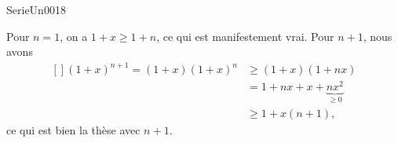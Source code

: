 

\begin{corrige}{SerieUn0018}

	Pour $n=1$, on a $1+x\geq 1+n$, ce qui est manifestement vrai. Pour $n+1$, nous avons
	\begin{equation}
		\begin{aligned}[]
			(1+x)^{n+1}=(1+x)(1+x)^n&\geq (1+x)(1+nx)\\
							&=1+nx+x+\underbrace{nx^2}_{\geq 0}\\
							&\geq 1+x(n+1),
		\end{aligned}
	\end{equation}
	ce qui est bien la thèse avec $n+1$.

\end{corrige}
